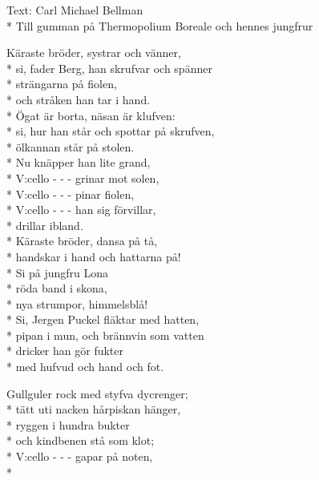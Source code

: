 \begin{SongText}
    \begin{SongInfo}
        Text: Carl Michael Bellman\\*%
        Till gumman på Thermopolium Boreale och hennes jungfrur
    \end{SongInfo}
    \begin{SongVerse}
        Käraste bröder, systrar och vänner,\\*%
        si, fader Berg, han skrufvar och spänner\\*%
        strängarna på fiolen,\\*%
        och stråken han tar i hand.\\*%
        Ögat är borta, näsan är klufven:\\*%
        si, hur han står och spottar på skrufven,\\*%
        ölkannan står på stolen.\\*%
        Nu knäpper han lite grand,\\*%
        V:cello - - - grinar mot solen,\\*%
        V:cello - - - pinar fiolen,\\*%
        V:cello - - - han sig förvillar,\\*%
        drillar ibland.\\*%
        Käraste bröder, dansa på tå,\\*%
        handskar i hand och hattarna på!\\*%
        Si på jungfru Lona\\*%
        röda band i skona,\\*%
        nya strumpor, himmelsblå!\\*%
        Si, Jergen Puckel fläktar med hatten,\\*%
        pipan i mun, och brännvin som vatten\\*%
        dricker han gör fukter\\*%
        med hufvud och hand och fot.
    \end{SongVerse}
    \begin{SongVerse}
        Gullguler rock med styfva dycrenger;\\*%
        tätt uti nacken hårpiskan hänger,\\*%
        ryggen i hundra bukter\\*%
        och kindbenen stå som klot;\\*%
        V:cello - - - gapar på noten,\\*%

\end{SongVerse}
\end{SongText}
